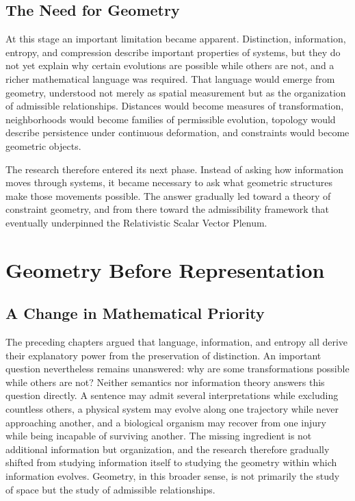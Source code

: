 \documentclass[11pt,oneside]{book}
\numberwithin{equation}{chapter}
\theoremstyle{definition}
\theoremstyle{plain}
\begin{document}
\section{The Need for Geometry}

At this stage an important limitation became apparent. Distinction, information, entropy, and compression describe important properties of systems, but they do not yet explain why certain evolutions are possible while others are not, and a richer mathematical language was required. That language would emerge from geometry, understood not merely as spatial measurement but as the organization of admissible relationships. Distances would become measures of transformation, neighborhoods would become families of permissible evolution, topology would describe persistence under continuous deformation, and constraints would become geometric objects.

The research therefore entered its next phase. Instead of asking how information moves through systems, it became necessary to ask what geometric structures make those movements possible. The answer gradually led toward a theory of constraint geometry, and from there toward the admissibility framework that eventually underpinned the Relativistic Scalar Vector Plenum.

\chapter{Geometry Before Representation}

\section{A Change in Mathematical Priority}

The preceding chapters argued that language, information, and entropy all derive their explanatory power from the preservation of distinction. An important question nevertheless remains unanswered: why are some transformations possible while others are not? Neither semantics nor information theory answers this question directly. A sentence may admit several interpretations while excluding countless others, a physical system may evolve along one trajectory while never approaching another, and a biological organism may recover from one injury while being incapable of surviving another. The missing ingredient is not additional information but organization, and the research therefore gradually shifted from studying information itself to studying the geometry within which information evolves. Geometry, in this broader sense, is not primarily the study of space but the study of admissible relationships.
\end{document}
